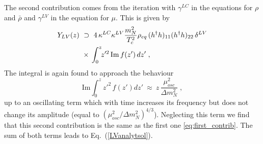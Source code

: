 \documentclass[prd,twocolumn,superscriptaddress,preprintnumbers,nofootinbib,
noshowpacs,groupedaddress]{revtex4-1} %
\begin{document}
\begin{appendix}
The second contribution comes from the iteration with $\gamma^{LC}$ in the equations for $\rho$ and $\bar \rho$ and $\gamma^{LV}$ in the equation for $\mu$. This is given by
\begin{align}
Y_{LV}(z) \ &\supset \ 4 \, \kappa^{LC} \kappa^{LV} \frac{m_N^2}{T_c^2} \rho_{eq} \, (h^\dag h)_{11} (h^\dag h)_{22} \, \delta^{LV} \notag\\
&\times \, \int_0^z \!\! z'^2 \, \mathrm{Im}\,f(z') \, d z' \;,
\end{align}
The integral is again found to approach the behaviour 
\begin{equation}
 \mathrm{Im} \int_0^{z} \!\! z'^2 \, f(z') d z' \ \approx \ z \, \frac{\mu^2_{osc}}{\Delta m^2_N} \;,
\end{equation}
up to an oscillating term which with time increases its frequency but does not change its amplitude (equal to $(\mu^2_{osc}/\Delta m_N^2)^{4/3}$). Neglecting this term we find that this second contribution is the same as the first one \eqref{eq:first_contrib}. The sum of both terms leads to Eq.~(\ref{LVanalytsol}).
\end{appendix}
\end{document}
